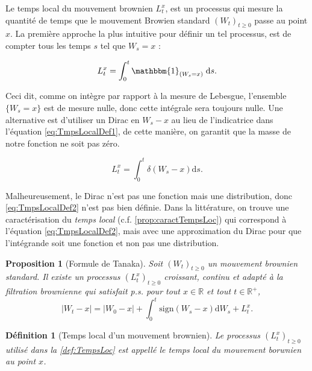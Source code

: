\documentclass[openany]{book}
\newcommand{\R}{\mathbb{R}}
\newcommand{\1}{\mathbbm{1}}
\newcommand{\sign}{\text{sign}}
\renewcommand{\d}{\mathrm{d}}
\theoremstyle{thmfont}
\theoremstyle{deffont}
\newtheorem{definition}[definition]{Définition}
\theoremstyle{thmfont}
\newtheorem{prop}[prop]{Proposition}
\theoremstyle{deffont}
\begin{document}
Le temps local du mouvement brownien $L_t^x$, est un processus qui mesure la quantité de temps que le mouvement Browien standard $(W_t)_{t\geq0}$ passe au point $x$.
La première approche la plus intuitive pour définir un tel processus, est de compter tous les temps $s$ tel que $W_s = x$ :

\begin{equation}
  \label{eq:TmpsLocalDef1}
   L^x_t= \int_0^t\1_{(W_s=x)}\;\d s.
  \end{equation}

Ceci dit, comme on intègre par rapport à la mesure de Lebesgue, l'ensemble $\{W_s = x\}$ est de mesure nulle, donc cette intégrale sera toujours nulle. Une alternative est d'utiliser un Dirac en $W_s - x$ au lieu de l'indicatrice dans l'équation \eqref{eq:TmpsLocalDef1}, de cette manière, on garantit que la masse de notre fonction ne soit pas zéro.

\begin{equation}
  \label{eq:TmpsLocalDef2}
  L^x_t= \int_0^t\delta(W_s-x)\d s.
\end{equation}

Malheureusement, le Dirac n'est pas une fonction mais une distribution, donc \eqref{eq:TmpsLocalDef2} n'est pas bien définie. Dans la littérature, on trouve une caractérisation du \textit{temps local} (c.f. \autoref{prop:caractTempsLoc}) qui correspond à l'équation \eqref{eq:TmpsLocalDef2}, mais avec une approximation du Dirac pour que l'intégrande soit une fonction et non pas une distribution. %

\begin{prop}[Formule de Tanaka]
  \label{def:TempsLoc}
  Soit $(W_t)_{t\geq0}$ un mouvement brownien standard. Il existe un processus $(L_t^x)_{t\geq0}$ croissant, continu et adapté à la filtration brownienne qui satisfait p.s. pour tout $x \in \R$ et tout $t \in \R^+$,
  \begin{equation}
    |W_t -x|  = |W_0-x| + \int_0^t\sign(W_s - x)\d W_s + L_t^x.
    \label{eq:tempsLocDef}
  \end{equation}
\end{prop}

\begin{definition}[Temps local d'un mouvement brownien]
  Le processus $(L_t^x)_{t\geq0}$ utilisé dans la \autoref{def:TempsLoc} est appellé le \textit{temps local du mouvement borwnien au point $x$.}
\end{definition}
\end{document}
